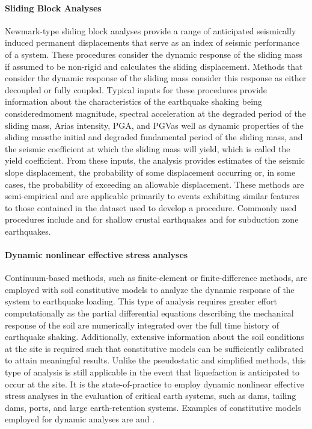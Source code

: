 \paragraph{Sliding Block Analyses} 
Newmark-type sliding block analyses provide a range of anticipated seismically induced permanent displacements that serve as an index of seismic performance of a system. These procedures consider the dynamic response of the sliding mass if assumed to be non-rigid and calculates the sliding displacement. Methods that consider the dynamic response of the sliding mass consider this response as either decoupled or fully coupled. Typical inputs for these procedures provide information about the characteristics of the earthquake shaking being considered\textemdash moment magnitude, spectral acceleration at the degraded period of the sliding mass, Arias intensity, PGA, and PGV\textemdash as well as dynamic properties of the sliding mass\textemdash the initial and degraded fundamental period of the sliding mass, and the seismic coefficient at which the sliding mass will yield, which is called the yield coefficient. From these inputs, the analysis provides estimates of the seismic slope displacement, the probability of some displacement occurring or, in some cases, the probability of exceeding an allowable displacement. These methods are semi-empirical and are applicable primarily to events exhibiting similar features to those contained in the dataset used to develop a procedure. Commonly used procedures include \cite{makdisi1978simplified, jibson2007regression, bray2007simplified, saygili2008empirical, rathje2014probabilistic} and \cite{bray2019procedure} for shallow crustal earthquakes and \cite{bray2018simplified} for subduction zone earthquakes.
\newline

\paragraph{Dynamic nonlinear effective stress analyses} 
Continuum-based methods, such as finite-element or finite-difference methods, are employed with soil constitutive models to analyze the dynamic response of the system to earthquake loading. This type of analysis requires greater effort computationally as the partial differential equations describing the mechanical response of the soil are numerically integrated over the full time history of earthquake shaking. Additionally, extensive information about the soil conditions at the site is required such that constitutive models can be sufficiently calibrated to attain meaningful results. Unlike the pseudostatic and simplified methods, this type of analysis is still applicable in the event that liquefaction is anticipated to occur at the site. It is the state-of-practice to employ dynamic nonlinear effective stress analyses in the evaluation of critical earth systems, such as dams, tailing dams, ports, and large earth-retention systems. Examples of constitutive models employed for dynamic analyses are \cite{yang2003computational, byrne2004numerical, boulanger2017pm4sand} and \cite{boulanger2018pm4silt}.

